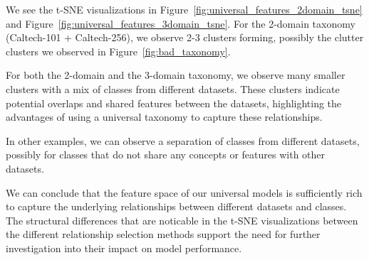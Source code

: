 We see the t-SNE visualizations in Figure~\ref{fig:universal_features_2domain_tsne} and Figure~\ref{fig:universal_features_3domain_tsne}.
For the 2-domain taxonomy (Caltech-101 + Caltech-256),
we observe 2-3 clusters forming, possibly the clutter clusters we observed in Figure~\ref{fig:bad_taxonomy}.

For both the 2-domain and the 3-domain taxonomy,
we observe many smaller clusters with a mix of classes from different datasets.
These clusters indicate potential overlaps and shared features between the datasets,
highlighting the advantages of using a universal taxonomy to capture these relationships.

In other examples, we can observe a separation of classes from different datasets,
possibly for classes that do not share any concepts or features with other datasets.

We can conclude that the feature space of our universal models is sufficiently rich to capture the underlying relationships between different datasets and classes.
The structural differences that are noticable in the t-SNE visualizations
between the different relationship selection methods support the need for further investigation into their impact on model performance.
